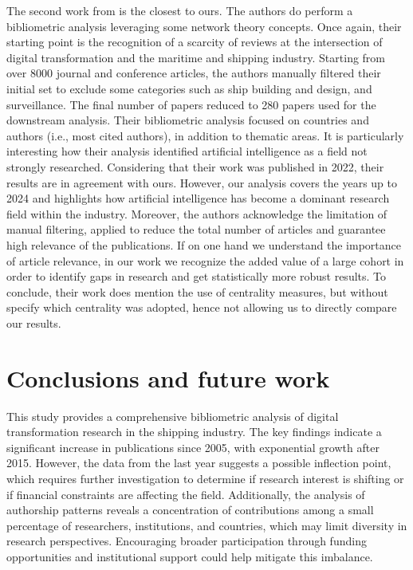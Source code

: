 \documentclass[jmse,review,submit,pdftex,moreauthors]{Definitions/mdpi}
\begin{document}
The second work from \citep{jovic2022digitalization} is the closest to ours. The authors do perform a bibliometric analysis leveraging some network theory concepts. Once again, their starting point is the recognition of a scarcity of reviews at the intersection of digital transformation and the maritime and shipping industry. Starting from over 8000 journal and conference articles, the authors manually filtered their initial set to exclude some categories such as ship building and design, and surveillance. The final number of papers reduced to 280 papers used for the downstream analysis. Their bibliometric analysis focused on countries and authors (i.e., most cited authors), in addition to thematic areas. It is particularly interesting how their analysis identified artificial intelligence as a field not strongly researched. Considering that their work was published in 2022, their results are in agreement with ours. However, our analysis covers the years up to 2024 and highlights how artificial intelligence has become a dominant research field within the industry. Moreover, the authors acknowledge the limitation of manual filtering, applied to reduce the total number of articles and guarantee high relevance of the publications. If on one hand we understand the importance of article relevance, in our work we recognize the added value of a large cohort in order to identify gaps in research and get statistically more robust results. To conclude, their work does mention the use of centrality measures, but without specify which centrality was adopted, hence not allowing us to directly compare our results.	 

\section{Conclusions and future work}
This study provides a comprehensive bibliometric analysis of digital transformation research in the shipping industry. The key findings indicate a significant increase in publications since 2005, with exponential growth after 2015. However, the data from the last year suggests a possible inflection point, which requires further investigation to determine if research interest is shifting or if financial constraints are affecting the field. Additionally, the analysis of authorship patterns reveals a concentration of contributions among a small percentage of researchers, institutions, and countries, which may limit diversity in research perspectives. Encouraging broader participation through funding opportunities and institutional support could help mitigate this imbalance.
\end{document}
